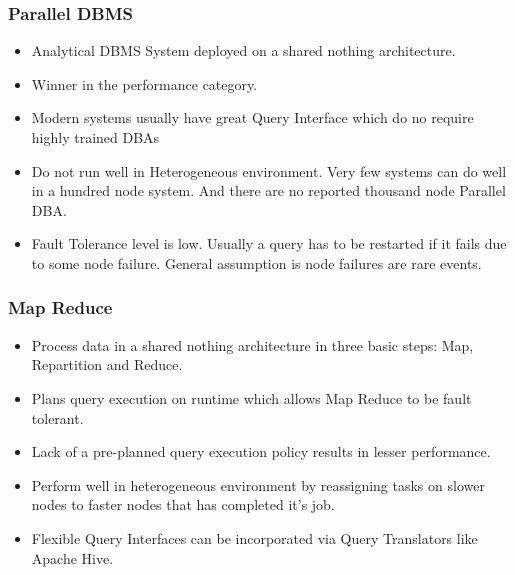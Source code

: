 \documentclass{beamer}
\begin{document}
\begin{frame}
  \frametitle{Parallel DBMS}
  \begin{itemize}
  \item Analytical DBMS System deployed on a shared nothing
    architecture.
  \item Winner in the performance category.
  \item Modern systems usually have great Query Interface which do no require highly trained DBAs
  \item Do not run well in Heterogeneous environment. Very few systems
    can do well in a hundred node system. And there are no reported
    thousand node Parallel DBA.
  \item Fault Tolerance level is low. Usually a query has to be restarted if it fails due to some node failure. General assumption is node failures are rare events.
  \end{itemize}
\end{frame}

\begin{frame}
  \frametitle{Map Reduce}
  \begin{itemize}
  \item Process data in a shared nothing architecture in three basic
    steps: Map, Repartition and Reduce.
  \item Plans query execution on runtime which allows Map Reduce to be
    fault tolerant.
  \item Lack of a pre-planned query execution policy results in lesser
    performance.
  \item Perform well in heterogeneous environment by reassigning tasks
    on slower nodes to faster nodes that has completed it’s job.
  \item Flexible Query Interfaces can be incorporated via Query Translators like Apache Hive.
  \end{itemize}
\end{frame}


\end{document}
